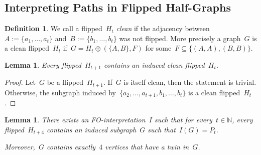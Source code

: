\documentclass[11pt]{article}      \usepackage[margin=1in]{geometry}  \usepackage{microtype}
\newtheorem{lemma}[theorem]{Lemma}
\theoremstyle{definition}
\newtheorem{definition}[theorem]{Definition}
\newcommand{\N}[0]{\mathrm{\mathbb{N}}}
\begin{document}
\subsection{Interpreting Paths in Flipped Half-Graphs}



\begin{definition}
    We call a flipped~$H_t$ \emph{clean} if the adjacency between~$A := \{a_1,\ldots,a_t\}$ and~$B := \{b_1,\ldots,b_t\}$ was not flipped.
    More precisely a graph~$G$ is a clean flipped~$H_t$ if~$G = H_t \oplus (\{A,B\},F)$ for some~$F\subseteq \{(A,A),(B,B)\}$.
\end{definition}

\begin{lemma}\label{lem:clean-flipped}
    Every flipped~$H_{t+1}$ contains an induced clean flipped~$H_{t}$.
\end{lemma}
\begin{proof}
    Let~$G$ be a flipped~$H_{t+1}$.
    If~$G$ is itself clean, then the statement is trivial.
    Otherwise, the subgraph induced by~$\{a_2,\ldots,a_{t+1}, b_1,\ldots,b_{t}\}$ is a clean flipped~$H_{t}$.
\end{proof}

\begin{lemma}\label{lem:paths-from-hg}
    There exists an FO-interpretation~$I$ such that for every~$t\in \N$, every flipped~$H_{t+4}$ contains an induced subgraph~$G$ such that~$I(G)= P_t$.
    
    \smallskip\noindent
    Moreover,~$G$ contains exactly~$4$ vertices that have a twin in~$G$.
\end{lemma}
\end{document}

